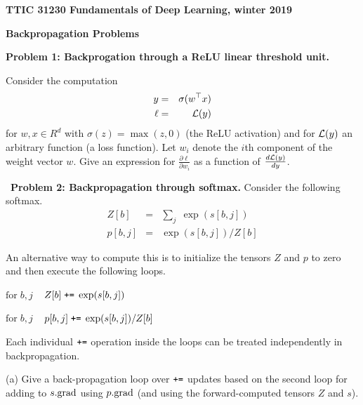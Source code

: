 \documentclass{article}
\newcommand{\solution}[1]{}
\begin{document}
\centerline{\bf TTIC 31230 Fundamentals of Deep Learning, winter 2019}
\medskip
\centerline{\bf Backpropagation  Problems}

\bigskip

{\bf Problem 1: Backprogation through a ReLU linear threshold unit.}

Consider the computation
\begin{eqnarray*}
  y & = & \sigma(w^\top x) \\
  \ell & = & {\cal L}(y)
\end{eqnarray*}
for $w,x \in R^d$ with $\sigma(z) = \max(z,0)$ (the ReLU activation)
and for ${\cal L}(y)$ an arbitrary function (a loss function).  Let $w_i$ denote the $i$th component of the weight vector $w$.
Give an expression for $\frac{\partial \ell}{\partial w_i}$ as a function of $\frac{d{\cal L}(y)}{dy}$.

\solution{
  There are various correct ways of writing the answer.  The following corresponds to a backpropagation computation.
  \begin{eqnarray*}
    \frac{d\ell}{dy} & = & \frac{d{\cal L}(y)}{dy} \\
    \frac{d\ell}{dw_i} & = & \frac{d\ell}{dy} \frac{dy}{dw_i} \;\;=\;\; \frac{d\ell}{dy}\; x_i\mathbf{1}\left[w^{\top}x \geq 0\right]
  \end{eqnarray*}
  }

\bigskip
~{\bf Problem 2:  Backpropagation through softmax.} Consider the following softmax.
\begin{eqnarray*}
  Z[b] & = & \sum_j\;\exp(s[b,j]) \\
  p[b,j] & = & \exp(s[b,j])/Z[b]
\end{eqnarray*}

An alternative way to compute this is to initialize the tensors $Z$ and $p$ to zero and then execute the following loops.

\medskip
$\mathrm{for}\;b,j$
$\;\;\;Z[b]\;\mbox{\tt +=}\;\exp(s[b,j])$

\medskip
$\mathrm{for}\;b,j$
$\;\;\;p[b,j] \;\mbox{\tt +=}\; \exp(s[b,j])/Z[b]$

\medskip
Each individual $\mbox{\tt +=}$ operation inside the loops can be treated independently in backpropagation.

\medskip
(a) Give a back-propagation loop over $\mbox{\tt +=}$ updates based on the second loop for adding to $s.\mathrm{grad}$ using $p.\mathrm{grad}$
(and using the forward-computed tensors $Z$ and $s$).

\solution{
  \medskip
  For $b,j\;\;\;s.\grad[b,j] \;\pluseq\; p.\grad[b,j]\exp(s[b,j])/Z[b]$}
\end{document}
